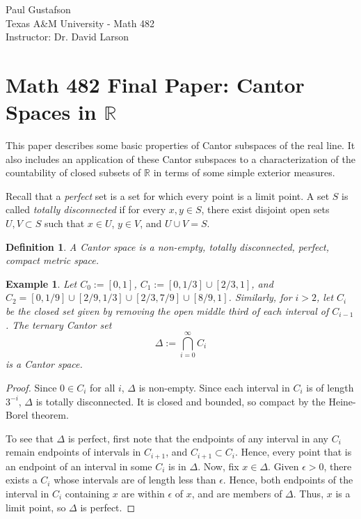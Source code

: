 \documentclass{article}
\newtheorem{definition}{Definition}
\newtheorem{example}{Example}
\newcommand{\R}{\mathbb{R}}
\begin{document}
\noindent Paul Gustafson\\
\noindent Texas A\&M University - Math 482 \\
\noindent Instructor: Dr. David Larson

\section*{Math 482 Final Paper: Cantor Spaces in $\R$}
This paper describes some basic properties of Cantor subspaces of the real line. It also includes an application of these Cantor subspaces to a characterization of the countability of closed subsets of $\R$ in terms of some simple exterior measures.

Recall that a \emph{perfect} set is a set for which every point is a limit point. A set $S$ is called \emph{totally disconnected} if for every $x, y \in S$, there exist disjoint open sets $U,V \subset S$ such that $x \in U$, $y \in V$, and $U \cup V = S$.

\begin{definition}
  A \emph{Cantor space} is a non-empty, totally disconnected, perfect, compact metric space.
\end{definition}

\begin{example}
Let $C_0 := [0,1]$, $C_1 := [0,1/3] \cup [2/3, 1]$, and $C_2 = [0,1/9] \cup [2/9, 1/3] \cup [2/3, 7/9] \cup [8/9, 1]$.
Similarly, for $i > 2$, let $C_i$ be the closed set given by removing the open middle third of each interval of $C_{i-1}$.
The \emph{ternary Cantor set} $$\Delta := \bigcap_{i=0}^\infty {C_i}$$ is a Cantor space.
\end{example}
\begin{proof}
Since $0 \in C_i$ for all $i$, $\Delta$ is non-empty. Since each interval in $C_i$ is of length $3^{-i}$, $\Delta$ is totally disconnected. It is closed and bounded,
so compact by the Heine-Borel theorem. 

To see that $\Delta$ is perfect, first note that the endpoints of any interval in any $C_i$ remain endpoints of intervals in $C_{i+1}$, and $C_{i+1} \subset C_i$.
Hence, every point that is an endpoint of an interval in some $C_i$ is in $\Delta$. Now, fix $x \in \Delta$. Given $\epsilon > 0$, there exists a $C_i$ whose intervals are of length less than $\epsilon$. Hence, both endpoints of the interval in $C_i$ containing $x$ are within $\epsilon$ of $x$, and are members of $\Delta$.  Thus, $x$ is a limit point, so $\Delta$ is perfect.
\end{proof}
\end{document}
